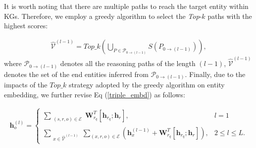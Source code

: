 \documentclass[sigconf]{acmart}
\begin{document}

It is worth noting that there are multiple paths to reach the target entity within KGs. %
Therefore, we employ a greedy algorithm to select the \textit{Top}-$k$ paths with the highest scores:%

\begin{equation}
\label{top_k_nodes}
\begin{aligned}
  \hat{\mathcal{V}}^{(l-1)} = Top\_k (\bigcup_{P \in \mathcal{P}_{0 \rightarrow (l-1)}} S(P_{0 \rightarrow (l-1)})),\nonumber
\end{aligned}
\end{equation}
where $\mathcal{P}_{0 \rightarrow (l-1)}$ denotes all the reasoning paths of the length $(l-1)$, $\hat{\mathcal{V}}^{(l-1)}$ denotes the set of the end entities inferred from $\mathcal{P}_{0 \rightarrow (l-1)}$.
Finally, due to the impacts of the $Top\_k$ strategy adopted by the greedy algorithm on entity embedding, we further revise Eq (\ref{triple_embd}) as follows:

\vspace{-10pt}
\begin{equation}
\begin{split}
\mathbf{h}_{o}^{(l)} = 
\begin{cases}
\sum\limits_{\substack{(s,r,o) \in \mathcal{E}}}\mathbf{W}_{r_q}^{T}[\mathbf{h}_{r_q};\mathbf{h}_{r}], &l=1 \\
\sum\limits_{\substack{x \in \hat{\mathcal{V}}^{(l-1)}}}\sum\limits_{(x,r,o) \in \mathcal{E}} \left( \mathbf{h}_{x}^{(l-1)}+ \mathbf{W}_{r_q}^{T}[\mathbf{h}_{r_q};\mathbf{h}_{r}] \right), &2 \leq l \leq L.\nonumber
\end{cases}
\end{split}
\label{iterative_embed_for_important_path}
\end{equation}
\end{document}
